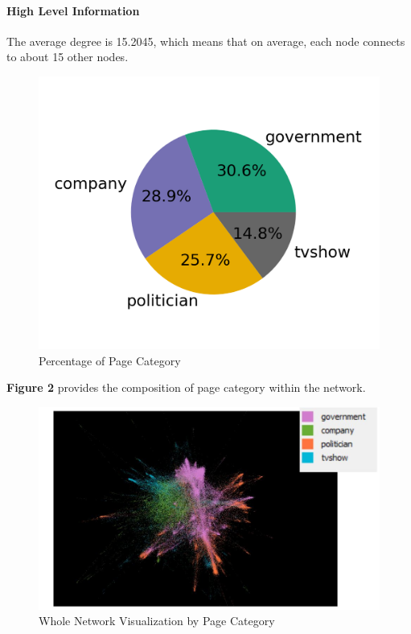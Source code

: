 \documentclass[11pt,twocolumn]{article}
\begin{document}
\paragraph{High Level Information} 
The average degree is 15.2045, which means that on average, each node connects to about 15 other nodes. 

\begin{figure}[hbt!]
\includegraphics[scale=0.2]{pie_chart_category.png} 
\caption{Percentage of Page Category}
\end{figure}

\textbf{Figure 2} provides the composition of page category within the network.


\begin{figure}[hbt!]
\includegraphics[scale=0.35]{gephi_whole_network_composition.JPG} 
\caption{Whole Network Visualization by Page Category}
\end{figure}
\end{document}
